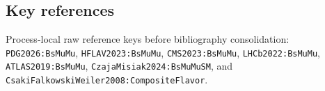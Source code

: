 \subsection*{Key references}
Process-local raw reference keys before bibliography consolidation:
\texttt{PDG2026:BsMuMu}, \texttt{HFLAV2023:BsMuMu},
\texttt{CMS2023:BsMuMu}, \texttt{LHCb2022:BsMuMu},
\texttt{ATLAS2019:BsMuMu}, \texttt{CzajaMisiak2024:BsMuMuSM}, and
\texttt{CsakiFalkowskiWeiler2008:CompositeFlavor}.
